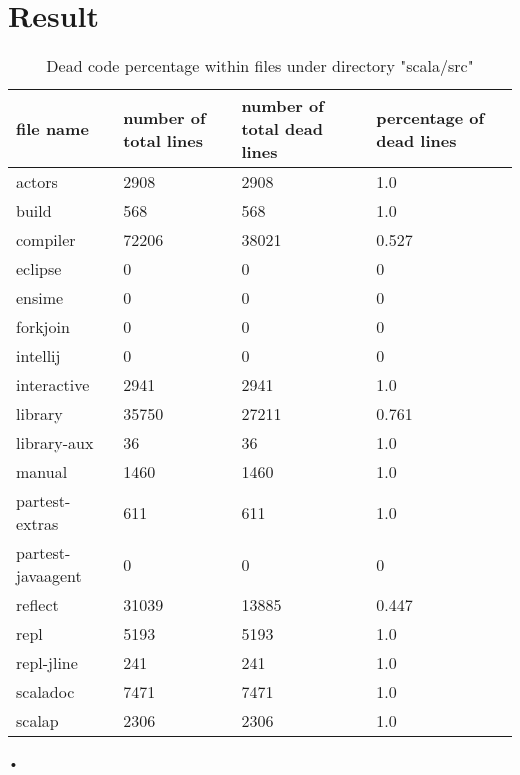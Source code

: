 \documentclass[a4paper]{article}
\begin{document}
\section{Result}
\begin{table}[!htb]
\begin{tabular}{|l|l|l|l|}
\hline
file name & number of total lines & number of total dead lines & percentage of dead lines \\
\hline
actors & 2908 & 2908 & 1.0\\ \hline
build & 568	& 568 & 1.0\\ \hline
compiler & 72206 & 38021 & 0.527\\ \hline
eclipse	& 0 & 0 & 0\\ \hline
ensime	& 0	& 0 & 0\\ \hline
forkjoin & 0 & 0 & 0\\ \hline
intellij & 0 & 0 & 0\\ \hline
interactive & 2941 & 2941 & 1.0\\ \hline
library & 35750 & 27211 & 0.761\\ \hline
library-aux & 36 & 36 & 1.0\\ \hline
manual & 1460 & 1460 & 1.0\\ \hline
partest-extras & 611 & 611 & 1.0\\ \hline
partest-javaagent & 0 & 0 & 0\\ \hline
reflect & 31039 & 13885	& 0.447\\ \hline
repl & 5193 & 5193 & 1.0\\ \hline
repl-jline & 241 & 241 & 1.0\\ \hline
scaladoc & 7471	& 7471 & 1.0\\ \hline
scalap & 2306 & 2306 & 1.0\\ \hline
\end{tabular}•
\caption{Dead code percentage within files under directory "scala/src"}
\end{table}
\end{document}
